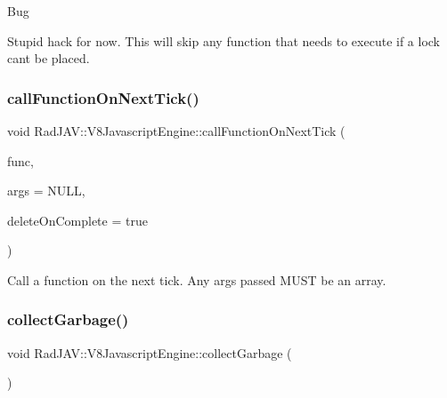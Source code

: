 \begin{DoxyRefDesc}{Bug}
\item[\mbox{\hyperlink{bug__bug000003}{Bug}}]Stupid hack for now. This will skip any function that needs to execute if a lock can\textquotesingle{}t be placed. \end{DoxyRefDesc}
\mbox{\label{class_rad_j_a_v_1_1_v8_javascript_engine_aa282f0464eebfd2a9ae53aea94853870}} 
\subsubsection{\texorpdfstring{call\+Function\+On\+Next\+Tick()}{callFunctionOnNextTick()}}
{\footnotesize\ttfamily void Rad\+J\+A\+V\+::\+V8\+Javascript\+Engine\+::call\+Function\+On\+Next\+Tick (\begin{DoxyParamCaption}\item[{v8\+::\+Persistent$<$ v8\+::\+Function $>$ $\ast$}]{func,  }\item[{v8\+::\+Persistent$<$ v8\+::\+Array $>$ $\ast$}]{args = {\ttfamily NULL},  }\item[{R\+J\+B\+O\+OL}]{delete\+On\+Complete = {\ttfamily true} }\end{DoxyParamCaption})}



Call a function on the next tick. Any args passed M\+U\+ST be an array. 

\mbox{\label{class_rad_j_a_v_1_1_v8_javascript_engine_ab9624aca14bbbcb2bb248d81efe8e402}} 
\subsubsection{\texorpdfstring{collect\+Garbage()}{collectGarbage()}}
{\footnotesize\ttfamily void Rad\+J\+A\+V\+::\+V8\+Javascript\+Engine\+::collect\+Garbage (\begin{DoxyParamCaption}{ }\end{DoxyParamCaption})\hspace{0.3cm}{\ttfamily [virtual]}}



